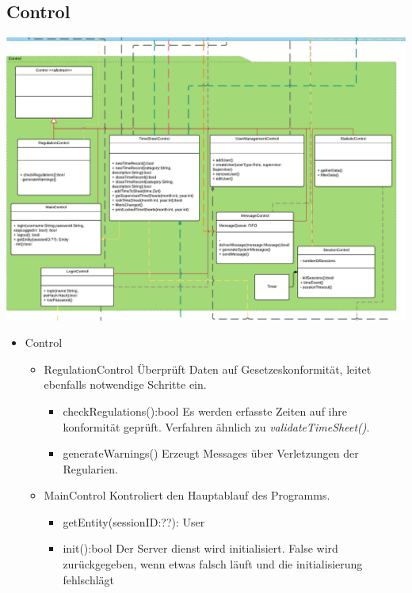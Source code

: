 \begin{itemize}
    \subsection{Control}
        \includegraphics[width=\linewidth]{Diagramms/class/control.pdf}\\
        \begin{itemize}
            \item{Control}
                \begin{itemize}
                    \item{RegulationControl}
                       Überprüft Daten auf Gesetzeskonformität, leitet ebenfalls notwendige Schritte ein.
                       \begin{itemize}
                           \item{checkRegulations():bool}
                            Es werden erfasste Zeiten auf ihre konformität geprüft.
                            Verfahren ähnlich zu \emph{validateTimeSheet()}.
                           \item{generateWarnings()}
                            Erzeugt Messages über Verletzungen der Regularien.
                       \end{itemize}

                    \item{MainControl}
                        Kontroliert den Hauptablauf des Programms.
                        \begin{itemize}
                             \item{getEntity(sessionID:??): User}
                             \item{init():bool}
                                Der Server dienst wird initialisiert.
                                False wird zurückgegeben, wenn etwas falsch läuft und die initialisierung fehlschlägt
                        \end{itemize}


\end{itemize}
\end{itemize}
\end{itemize}
